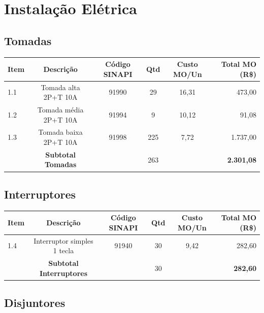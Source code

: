 \documentclass[12pt,a4paper]{article}
\renewenvironment{table}%
{\begin{center}%
\scriptsize%
\addtolength{\tabcolsep}{-2pt}%
}%
{\end{center}}
\begin{document}
\pagebreak

\section{Instalação Elétrica}

\subsection{Tomadas}

\begin{table}
\centering
\begin{tabular}{lccccr}
\toprule
\textbf{Item} & \textbf{Descrição} & \textbf{Código SINAPI} & \textbf{Qtd} & \textbf{Custo MO/Un} & \textbf{Total MO (R\$)} \\
\midrule
1.1 & Tomada alta 2P+T 10A & 91990 & 29 & 16,31 & 473,00 \\
1.2 & Tomada média 2P+T 10A & 91994 & 9 & 10,12 & 91,08 \\
1.3 & Tomada baixa 2P+T 10A & 91998 & 225 & 7,72 & 1.737,00 \\
\midrule
 & \textbf{Subtotal Tomadas} & & 263 & & \textbf{2.301,08} \\
\bottomrule
\end{tabular}
\end{table}

\subsection{Interruptores}

\begin{table}
\centering
\begin{tabular}{lccccr}
\toprule
\textbf{Item} & \textbf{Descrição} & \textbf{Código SINAPI} & \textbf{Qtd} & \textbf{Custo MO/Un} & \textbf{Total MO (R\$)} \\
\midrule
1.4 & Interruptor simples 1 tecla & 91940 & 30 & 9,42 & 282,60 \\
\midrule
 & \textbf{Subtotal Interruptores} & & 30 & & \textbf{282,60} \\
\bottomrule
\end{tabular}
\end{table}

\subsection{Disjuntores}
\end{document}
